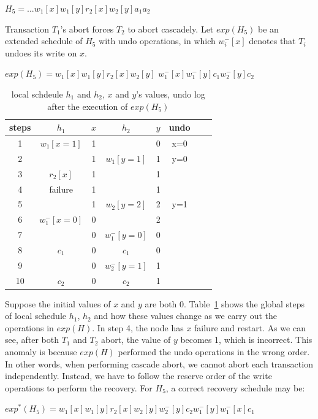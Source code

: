 \documentclass[conference]{IEEEtran}
\begin{document}
\begin{center}
${H_5 = ...w_1[x]w_1[y]r_2[x]w_2[y]a_1a_2}$
\end{center}

Transaction ${T_1}$'s abort forces ${T_2}$ to abort cascadely.
Let ${exp(H_5)}$ be an extended schedule of $H_5$ with undo operations,
in which ${w^-_i[x]}$ denotes that ${T_i}$ undoes its write on ${x}$.

\begin{center}
  ${exp(H_5) =  w_1[x]w_1[y]r_2[x] w_2[y]}$
  ${w^-_1[x]w^-_1[y]  c_1 w^-_2[y]c_2}$
\end{center}


\begin{table}[tbp]
  \centering
  \caption{local schdeule $h_1$ and $h_2$, $x$ and $y$'s values, undo log after the execution of ${exp(H_5)}$}
  \begin{tabular}{|c|c|c|c|c|c|c|c|}
  \hline
steps & $h_1$ & $x$ & $h_2$ & $y$ & undo   \\
  \hline
  \hline
 1& $w_1[x=1]$ & 1 & &  0 & x=0  \\
  \hline
  2& & 1 & $w_1[y=1]$ & 1 & y=0   \\
  \hline
3 & $r_2[x]$ & 1 & & 1 &    \\

  \hline
 4 & failure  & 1 & & 1 &  \\
  \hline
 5& & 1 &   $w_2[y=2]$ & 2 & y=1  \\
  \hline
6  & $w^-_1[x=0]$ & 0 && 2 &   \\
  \hline
7 & & 0 & $w^-_1[y=0]$ & 0 &   \\
  \hline


8  & $c_1$ & 0 &$c_1$& 0 &   \\
  \hline
9 & & 0 &  $w^-_2[y=1]$& 1 &   \\
  \hline
10 & $c_2$ & 0 &$c_2$& 1 &  \\
  \hline
  \end{tabular}

\label{tbl:x_y_vlues}
\end{table}


Suppose the initial values of ${x}$ and ${y}$ are both 0.
Table~\ref{tbl:x_y_vlues} shows the global steps of local schedule ${h_1}$, ${h_2}$ and how these values change as we carry out the operations in $exp(H)$.
In step 4, the node has ${x}$ failure and restart.  
As we can see, after both ${T_1}$ and ${T_2}$ abort, the value of ${y}$ becomes 1, which is incorrect.
This anomaly is because $exp(H)$ performed the undo operations in the wrong order.
In other words, when performing cascade abort, we cannot abort each transaction independently.
Instead, we have to follow the reserve order of the write operations to perform the recovery.
For ${H_5}$, a correct recovery schedule may be:
\begin{center}
${exp^*(H_5) = w_1[x]w_1[y]r_2[x]w_2[y]w^-_2[y]c_2w^-_1[y]w^-_1[x]c_1}$
\end{center}
\end{document}
